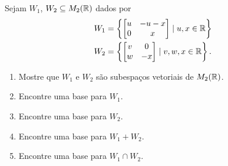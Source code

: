 \documentclass[12pt]{exam}
\begin{document}
    \begin{exercicio}
        Sejam $W_1$, $W_2 \subseteq M_2(\mathbb{R})$ dados por
        \begin{align*}
            W_1 &= \left\{
                        \begin{bmatrix}
                            u & -u -x\\
                            0 & x
                        \end{bmatrix}
                        \mid u, x \in \mathbb{R}
                    \right\}\\
            W_2 &= \left\{
                        \begin{bmatrix}
                            v & 0\\
                            w & -x
                        \end{bmatrix}
                        \mid v, w, x \in \mathbb{R}
                    \right\}.
        \end{align*}
        
        \begin{enumerate}[label={\alph*})]
        
            \item Mostre que $W_1$ e $W_2$ s\~ao subespa\c{c}os vetoriais de $M_2(\mathbb{R})$.
                
            \item Encontre uma base para $W_1$.
            
            \item Encontre uma base para $W_2$.
            
            \item Encontre uma base para $W_1 + W_2$.
            
            \item Encontre uma base para $W_1 \cap W_2$.
        \end{enumerate}
    \end{exercicio}
\end{document}
